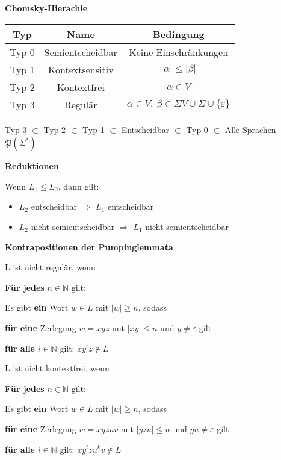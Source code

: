 \documentclass[10pt,fleqn, a4paper]{article}
\begin{document}
{\bf Chomsky-Hierachie}\newline

\begin{center}
\begin{tabular}{|c|c|c|}
\hline
{\bf Typ}&{\bf Name}&{Bedingung}\\\hline\hline
Typ 0&Semientscheidbar&Keine Einschränkungen\\\hline
Typ 1&Kontextsensitiv&$|\alpha|\leq|\beta|$\\\hline
Typ 2&Kontextfrei&$\alpha\in V$\\\hline
Typ 3&Regulär&$\alpha\in V,\ \beta\in\Sigma V\cup\Sigma\cup\{\varepsilon\}$\\\hline
\end{tabular}
\end{center}

\begin{center}
Typ 3 $\subset$ Typ 2 $\subset$ Typ 1 $\subset$ Entscheidbar $\subset$ Typ 0 $\subset$ Alle Sprachen $\mathfrak P(\Sigma^*)$
\end{center}

{\bf Reduktionen}\newline

Wenn $L_1\leq L_2$, dann gilt:
\begin{itemize}
\item $L_2$ entscheidbar $\Rightarrow$ $L_1$ entscheidbar
\item $L_2$ nicht semientscheidbar $\Rightarrow$ $L_1$ nicht semientscheidbar\newline
\end{itemize}

{\bf Kontrapositionen der Pumpinglemmata}\newline

\begin{minipage}[t]{0.5\textwidth}
L ist nicht regulär, wenn

{\bf Für jedes} $n\in\mathbb N$ gilt:

Es gibt {\bf ein} Wort $w\in L$ mit $|w|\geq n$, sodass

{\bf für eine} Zerlegung $w=xyz$ mit $|xy|\leq n$ und $y\neq\varepsilon$ gilt

{\bf für alle} $i\in\mathbb N$ gilt: $xy^iz\notin L$
\end{minipage}
\begin{minipage}[t]{0.5\textwidth}
L ist nicht kontextfrei, wenn

{\bf Für jedes} $n\in\mathbb N$ gilt:

Es gibt {\bf ein} Wort $w\in L$ mit $|w|\geq n$, sodass

{\bf für eine} Zerlegung $w=xyzuv$ mit $|yzu|\leq n$ und $yu\neq\varepsilon$ gilt

{\bf für alle} $i\in\mathbb N$ gilt: $xy^izu^kv\notin L$
\end{minipage}
\end{document}

